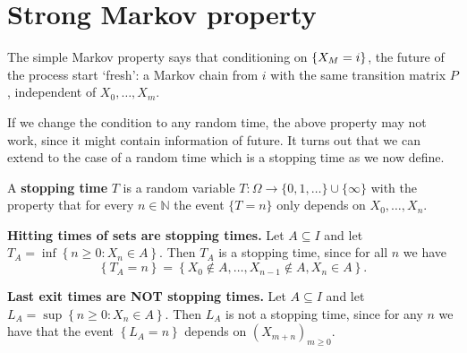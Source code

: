 \documentclass[a4paper]{article}
\begin{document}
\section{Strong Markov property}
The simple Markov property says that conditioning on $\qty{X_M=i}$, the future of the process start `fresh': a Markov chain from $i$ with the same transition matrix $P$, independent of $X_0,\dots,X_m$. 

If we change the condition to any random time, the above property may not work, since it might contain information of future. It turns out that we can extend to the case of a random time which is a stopping time as we now define.

\begin{definition}
    A \textbf{stopping time} $T$ is a random variable $T: \Omega \rightarrow\{0,1, \ldots\} \cup\{\infty\}$ with the property that for every $n \in \mathbb{N}$ the event $\{T=n\}$ only depends on $X_0, \ldots, X_n$.
\end{definition}

\begin{example}
\textbf{Hitting times of sets are stopping times.} Let $A \subseteq I$ and let $T_A=\inf \left\{n \geq 0: X_n \in A\right\}$. Then $T_A$ is a stopping time, since for all $n$ we have
\[
\left\{T_A=n\right\}=\left\{X_0 \notin A, \ldots, X_{n-1} \notin A, X_n \in A\right\} .
\]

\textbf{Last exit times are NOT stopping times.} Let $A \subseteq I$ and let $L_A=\sup \left\{n \geq 0: X_n \in A\right\}$. Then $L_A$ is not a stopping time, since for any $n$ we have that the event $\left\{L_A=n\right\}$ depends on $\left(X_{m+n}\right)_{m \geq 0}$.
\end{example}
\end{document}
